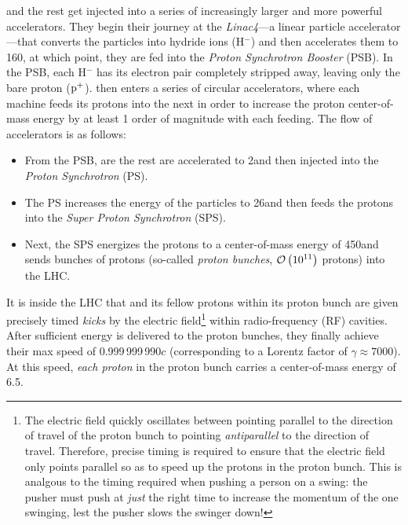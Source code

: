 \pname and the rest get injected into a series of increasingly larger and more powerful accelerators.
They begin their journey at the \emph{Linac4}---a linear particle accelerator---that converts the particles into hydride ions (H$^-$) and then accelerates them to 160\MeV, at which point, they are fed into the \emph{Proton Synchrotron Booster} (PSB).
In the PSB, each H$^-$ has its electron pair completely stripped away, leaving only the bare proton ($\mathrm{p}^+$).
\pname then enters a series of circular accelerators, where each machine feeds its protons into the next in order to increase the proton center-of-mass energy by at least 1 order of magnitude with each feeding.
The flow of accelerators is as follows:
\begin{itemize}
    \item From the PSB, \pname are the rest are accelerated to 2\GeV and then injected into the \emph{Proton Synchrotron} (PS).
    \item The PS increases the energy of the particles to 26\GeV and then feeds the protons into the \emph{Super Proton Synchrotron} (SPS).
    \item Next, the SPS energizes the protons to a center-of-mass energy of 450\GeV and sends bunches of protons (so-called \emph{proton bunches}, $\mathcal{O}\left(\text{10}^\text{11}\right)$ protons) into the LHC. %
\end{itemize}
It is inside the LHC that \pname and its fellow protons within its proton bunch are given precisely timed \emph{kicks} by the electric field\footnote{
    The electric field quickly oscillates between pointing parallel to the direction of travel of the proton bunch to pointing \emph{antiparallel} to the direction of travel.
    Therefore, precise timing is required to ensure that the electric field only points parallel so as to speed up the protons in the proton bunch.
    This is analgous to the timing required when pushing a person on a swing:
    the pusher must push at \emph{just} the right time to increase the momentum of the one swinging, lest the pusher slows the swinger down!
} within radio-frequency (RF) cavities.
After sufficient energy is delivered to the proton bunches, they finally achieve their max speed of 0.999\,999\,990$c$ (corresponding to a Lorentz factor of $\gamma \approx 7000$). %
At this speed, \emph{each proton} in the proton bunch carries a center-of-mass energy of 6.5\TeV.

